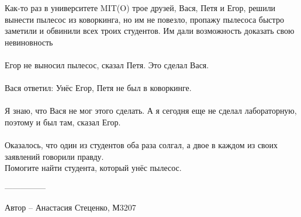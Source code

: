 \question
Как-то раз в университете MIT(O) трое друзей, Вася, Петя и Егор, решили вынести пылесос из коворкинга, но им не повезло, пропажу пылесоса быстро заметили и обвинили всех троих студентов. Им дали возможность доказать свою невиновность
\\
\\
{\textemdash} Егор не выносил пылесос, {\textemdash} сказал Петя. {\textemdash} Это сделал Вася.
\\
\\
Вася ответил:  {\textemdash} Унёс Егор, Петя не был в коворкинге.
\\
\\
{\textemdash} Я знаю, что Вася не мог этого сделать. А я сегодня еще не сделал лабораторную, поэтому и был там, {\textemdash} сказал Егор.
\\
\\
Оказалось, что один из студентов оба раза солгал, а двое в каждом из своих заявлений говорили правду.
\\
Помогите найти студента, который унёс пылесос.

---------------

Автор -- Анастасия Стеценко, М3207